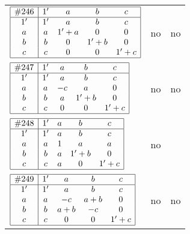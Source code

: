 \documentclass[12pt]{article}
\newcommand{\join}{\mathbin{+}}%
\newcommand{\id}{{1'}}%
\renewcommand{\top}{1}%
\begin{document}
\begin{center}
\begin{longtable}{l|c|c}
$
\begin{array}{|c|cccc|} \hline
\#246 & \id & a & b & c \\ \hline
\id & \id & a & b & c \\
a & a & \id \join a & 0 & 0 \\
b & b & 0 & \id \join b & 0 \\
c & c & 0 & 0 & \id \join c \\ \hline
\end{array}
$
 & no  
 & no      \\[15mm]

$
\begin{array}{|c|cccc|} \hline
\#247 & \id & a & b & c \\ \hline
\id & \id & a & b & c \\
a & a & -c & a & 0 \\
b & b & a & \id \join b & 0 \\
c & c & 0 & 0 & \id \join c \\ \hline
\end{array}
$
 & no  
 & no      \\[15mm]

$
\begin{array}{|c|cccc|} \hline
\#248 & \id & a & b & c \\ \hline
\id & \id & a & b & c \\
a & a & \top & a & a \\
b & b & a & \id \join b & 0 \\
c & c & a & 0 & \id \join c \\ \hline
\end{array}
$
 & no  
 & \adjustbox{valign=c, max height=1.6cm}{$
\left[ \begin{array}{ccccccc}
\id & a & a & b & a & b & a \\ 
a & \id & a & a & c & a & c \\ 
a & a & \id & a & a & a & a \\ 
b & a & a & \id & a & b & a \\ 
a & c & a & a & \id & a & c \\ 
b & a & a & b & a & \id & a \\ 
a & c & a & a & c & a & \id
\end{array}\right]
$}      \\[15mm]

$
\begin{array}{|c|cccc|} \hline
\#249 & \id & a & b & c \\ \hline
\id & \id & a & b & c \\
a & a & -c & a \join b & 0 \\
b & b & a \join b & -c & 0 \\
c & c & 0 & 0 & \id \join c \\ \hline
\end{array}
$
 & no  
 & no      \\[15mm]


\end{longtable}
\end{center}
\end{document}
